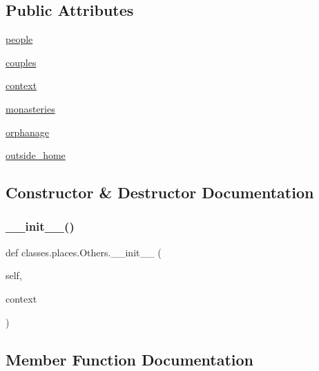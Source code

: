 \subsection*{Public Attributes}
\begin{DoxyCompactItemize}
\item 
\hyperlink{classclasses_1_1places_1_1Others_a50107bcbb4a55bb27bc303e3eea0cd1a}{people}
\item 
\hyperlink{classclasses_1_1places_1_1Others_a2804f8e730cd592f0093e5ceaeffcaed}{couples}
\item 
\hyperlink{classclasses_1_1places_1_1Others_a85fdc7de037a236d8f0456ff63b300fc}{context}
\item 
\hyperlink{classclasses_1_1places_1_1Others_a1bef0a9d25fb463aff62a786dae00d4b}{monasteries}
\item 
\hyperlink{classclasses_1_1places_1_1Others_a6a6bb1c5ed0a75614d5f762168a2de02}{orphanage}
\item 
\hyperlink{classclasses_1_1places_1_1Others_aa9bd8a8aa26c6be376f67a80ab628e1d}{outside\+\_\+home}
\end{DoxyCompactItemize}


\subsection{Constructor \& Destructor Documentation}
\mbox{\label{classclasses_1_1places_1_1Others_a8422b554ed44cb4c62e580d11e6a546d}} 
\subsubsection{\texorpdfstring{\+\_\+\+\_\+init\+\_\+\+\_\+()}{\_\_init\_\_()}}
{\footnotesize\ttfamily def classes.\+places.\+Others.\+\_\+\+\_\+init\+\_\+\+\_\+ (\begin{DoxyParamCaption}\item[{}]{self,  }\item[{}]{context }\end{DoxyParamCaption})}



\subsection{Member Function Documentation}
\mbox{\label{classclasses_1_1places_1_1Others_ac64c4a57f33b00d6c4a1e7ebe4a53a82}} 
